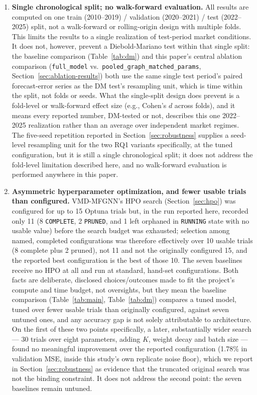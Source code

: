 \documentclass[journal]{IEEEtran}
\begin{document}
\begin{enumerate}
re-running the entire completed expanded-scope training pipeline, which is out of scope here. This finding is reflected directly in this paper's main results tables (Table~\ref{tab:main}, Table~\ref{tab:dm}), which report the expanded $N=15$ configuration and show exactly the LSTM and Transformer regressions described above.
    \item \textbf{Single chronological split; no walk-forward evaluation.} All results are computed on one train (2010--2019) / validation (2020--2021) / test (2022--2025) split, not a walk-forward or rolling-origin design with multiple folds. This limits the results to a single realization of test-period market conditions. It does not, however, prevent a Diebold-Mariano test within that single split: the baseline comparison (Table~\ref{tab:dm}) and this paper's central ablation comparison (\texttt{full\_model} vs.\ \texttt{pooled\_graph\_matched\_params}, Section~\ref{sec:ablation-results}) both use the same single test period's paired forecast-error series as the DM test's resampling unit, which is time within the split, not folds or seeds. What the single-split design does prevent is a fold-level or walk-forward effect size (e.g., Cohen's $d$ across folds), and it means every reported number, DM-tested or not, describes this one 2022--2025 realization rather than an average over independent market regimes. The five-seed repetition reported in Section~\ref{sec:robustness} supplies a seed-level resampling unit for the two RQ1 variants specifically, at the tuned configuration, but it is still a single chronological split; it does not address the fold-level limitation described here, and no walk-forward evaluation is performed anywhere in this paper.
    \item \textbf{Asymmetric hyperparameter optimization, and fewer usable trials than configured.} VMD-MFGNN's HPO search (Section~\ref{sec:hpo}) was configured for up to 15 Optuna trials but, in the run reported here, recorded only 11 (8 \texttt{COMPLETE}, 2 \texttt{PRUNED}, and 1 left orphaned in \texttt{RUNNING} state with no usable value) before the search budget was exhausted; selection among named, completed configurations was therefore effectively over 10 usable trials (8 complete plus 2 pruned), not 11 and not the originally configured 15, and the reported best configuration is the best of those 10. The seven baselines receive no HPO at all and run at standard, hand-set configurations. Both facts are deliberate, disclosed choices/outcomes made to fit the project's compute and time budget, not oversights, but they mean the baseline comparison (Table~\ref{tab:main}, Table~\ref{tab:dm}) compares a tuned model, tuned over fewer usable trials than originally configured, against seven untuned ones, and any accuracy gap is not solely attributable to architecture. On the first of these two points specifically, a later, substantially wider search --- 30 trials over eight parameters, adding $K$, weight decay and batch size --- found no meaningful improvement over the reported configuration (1.78\% in validation MSE, inside this study's own replicate noise floor), which we report in Section~\ref{sec:robustness} as evidence that the truncated original search was not the binding constraint. It does not address the second point: the seven baselines remain untuned.

\end{enumerate}
\end{document}
